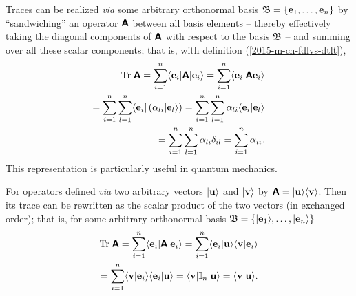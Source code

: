 Traces can be realized {\it via} some arbitrary orthonormal basis ${\frak B} =\{
{\bf e}_1,
\ldots ,
{\bf e}_n
\}$
by ``sandwiching'' an operator $\textsf{\textbf{A}}$ between all basis elements -- thereby effectively taking the diagonal components
of    $\textsf{\textbf{A}}$ with respect to the basis ${\frak B}$ --
and summing over all these scalar components; that is, with definition (\ref{2015-m-ch-fdlvs-dtlt}),
\begin{equation}
\begin{split}
\textrm{Tr}\;\textsf{\textbf{A}}
=\sum_{i=1}^n   \langle {\bf e}_i \vert \textsf{\textbf{A}} \vert {\bf e}_i \rangle
=\sum_{i=1}^n   \langle {\bf e}_i \vert \textsf{\textbf{A}}  {\bf e}_i \rangle  \\
=\sum_{i=1}^n  \sum_{l=1}^n  \langle {\bf e}_i \vert \left(\alpha_{li} \vert  {\bf e}_l \rangle \right)
=\sum_{i=1}^n  \sum_{l=1}^n  \alpha_{li} \langle {\bf e}_i \vert  {\bf e}_l \rangle \\
=\sum_{i=1}^n  \sum_{l=1}^n  \alpha_{li} \delta_{il}
=\sum_{i=1}^n   \alpha_{ii}
.
\end{split}
\end{equation}
This representation is particularly useful in quantum mechanics.

For operators defined {\em via} two arbitrary vectors
$\vert {\bf u} \rangle$
and
$\vert {\bf v} \rangle$
by
$\textsf{\textbf{A}} =  \vert {\bf u} \rangle \langle {\bf v} \rangle
$.
Then its trace can be rewritten as the scalar product of the two vectors (in exchanged order); that is,
for  some arbitrary orthonormal basis ${\frak B} =\{
 \vert {\bf e}_1\rangle ,
\ldots ,
 \vert {\bf e}_n\rangle
\}$
\begin{equation}
\begin{split}
\textrm{Tr}\;\textsf{\textbf{A}}
=\sum_{i=1}^n   \langle {\bf e}_i \vert \textsf{\textbf{A}} \vert {\bf e}_i \rangle
=\sum_{i=1}^n   \langle {\bf e}_i \vert {\bf u} \rangle \langle {\bf v} \vert   {\bf e}_i \rangle  \\
=\sum_{i=1}^n   \langle {\bf v} \vert   {\bf e}_i \rangle \langle {\bf e}_i \vert {\bf u} \rangle
=   \langle {\bf v} \vert   {\Bbb I}_n \vert {\bf u} \rangle
=   \langle {\bf v} \vert  {\bf u} \rangle
.
\end{split}
\end{equation}

